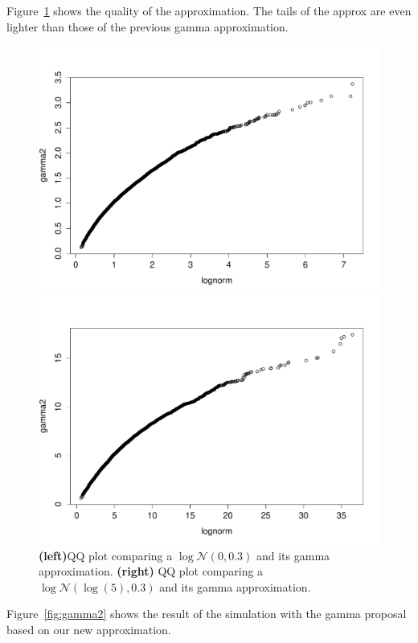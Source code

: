 \documentclass{article}
\begin{document}
Figure~\ref{fig:approx2} shows the quality of the approximation. The tails of the approx are even lighter than those of the previous gamma approximation.

\begin{figure}[htb]
	\centering
	\begin{minipage}{.45\textwidth}
		\centering
		\includegraphics[width=0.97\linewidth]{bootstrap-filter/approx203.pdf}
	\end{minipage}
	\begin{minipage}{.45\textwidth}
		\centering
		\includegraphics[width=0.97\linewidth]{bootstrap-filter/approx2coeff5sigma03.pdf}
	\end{minipage}
	\caption{\textbf{(left)}QQ plot comparing a $\log\mathcal{N}(0, 0.3)$ and its gamma approximation. \textbf{(right)} QQ plot comparing a $\log\mathcal{N}(\log(5), 0.3)$ and its gamma approximation.}
	\label{fig:approx2}
\end{figure}
 \clearpage
Figure~\ref{fig:gamma2} shows the result of the simulation with the gamma proposal based on our new approximation.
\end{document}
